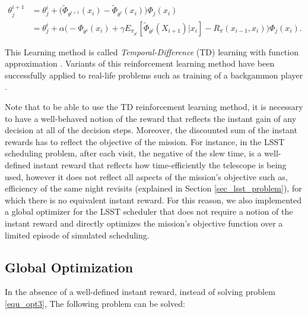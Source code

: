 \documentclass[12pt,aas_macros]{article}
\theoremstyle{definition}
\begin{document}
\begin{equation} \label{equ_TD_update}
\begin{aligned}
\theta_j^{i+1} &= \theta_j^{i} + \Big( \tilde \Phi_{\theta^{i+1}}(x_{{i}})  - \tilde \Phi_{\theta^{i}}(x_{{i}}) \Big)\Phi_j(x_{i})\\
& = \theta_j^{i} + \alpha \Big(-\Phi_{\theta^{i}}(x_{{i}}) + \gamma  E_{\pi_{\theta^i}}[\tilde \Phi_{\theta^{i}}(X_{{i+1}})|x_{{i}}] -R_{\pi}(x_{i-1},x_i)  \Big)\Phi_j(x_{i}).
\end{aligned}
\end{equation}

This Learning method is called \textit{Temporal-Difference} (TD) learning with function approximation \cite{tsitsiklis1997analysis}. Variants of this reinforcement learning method have been successfully applied to real-life problems such as training of a backgammon player \cite{tesauro1995temporal}.


Note that to be able to use the TD reinforcement learning method, it is necessary to have a well-behaved notion of the reward that reflects the instant gain of any decision at all of the decision steps. Moreover, the discounted sum of the instant rewards has to reflect the objective of the mission. For instance, in the LSST scheduling problem, after each visit, the negative of the slew time, is a well-defined instant reward that reflects how time-efficiently the telescope is being used, however it does not reflect all aspects of the mission's objective such as, efficiency of the same night revisits (explained in Section \ref{sec_lsst_problem}), for which there is no equivalent instant reward. For this reason, we also implemented a global optimizer for the LSST scheduler that does not require a notion of the instant reward and directly optimizes the mission's objective function over a limited  episode of simulated scheduling. 

\subsection{Global Optimization}
In the absence of a well-defined instant reward, instead of solving problem \ref{equ_opt3}, The following problem can be solved:
\end{document}

